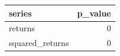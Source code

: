 
\begin{tabular}{lr}
\toprule
series & p\_value\\
\midrule
returns & 0\\
squared\_returns & 0\\
\bottomrule
\end{tabular}
